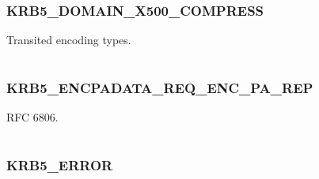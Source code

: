 \documentclass[letterpaper,10pt,english]{sphinxmanual}
\begin{document}
\subsubsection{KRB5\_DOMAIN\_X500\_COMPRESS}
\label{appdev/refs/macros/KRB5_DOMAIN_X500_COMPRESS::doc}\label{appdev/refs/macros/KRB5_DOMAIN_X500_COMPRESS:krb5-domain-x500-compress}\label{appdev/refs/macros/KRB5_DOMAIN_X500_COMPRESS:krb5-domain-x500-compress-data}

\begin{fulllineitems}
\label{appdev/refs/macros/KRB5_DOMAIN_X500_COMPRESS:KRB5_DOMAIN_X500_COMPRESS}
\end{fulllineitems}


Transited encoding types.

\begin{tabulary}{\linewidth}{|L|L|}
\hline

 & 
\\\hline
\end{tabulary}



\subsubsection{KRB5\_ENCPADATA\_REQ\_ENC\_PA\_REP}
\label{appdev/refs/macros/KRB5_ENCPADATA_REQ_ENC_PA_REP:krb5-encpadata-req-enc-pa-rep}\label{appdev/refs/macros/KRB5_ENCPADATA_REQ_ENC_PA_REP:krb5-encpadata-req-enc-pa-rep-data}\label{appdev/refs/macros/KRB5_ENCPADATA_REQ_ENC_PA_REP::doc}

\begin{fulllineitems}
\label{appdev/refs/macros/KRB5_ENCPADATA_REQ_ENC_PA_REP:KRB5_ENCPADATA_REQ_ENC_PA_REP}
\end{fulllineitems}


RFC 6806.

\begin{tabulary}{\linewidth}{|L|L|}
\hline

 & 
\\\hline
\end{tabulary}



\subsubsection{KRB5\_ERROR}
\label{appdev/refs/macros/KRB5_ERROR:krb5-error-data}\label{appdev/refs/macros/KRB5_ERROR:krb5-error}\label{appdev/refs/macros/KRB5_ERROR::doc}
\end{document}

